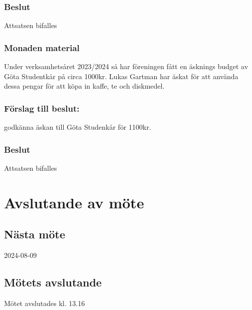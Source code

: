 \documentclass[protokoll]{dvd}
\begin{document}
\subsubsection*{Beslut}
\begin{attsatser}
    \item Attsatsen bifalles
\end{attsatser}

\subsubsection*{Monaden material}
Under verksamhetsåret 2023/2024 så har föreningen fått en äsknings budget av Göta Studentkår
på circa 1000kr. Lukas Gartman har äskat för att använda dessa pengar för att köpa
in kaffe, te och diskmedel.
\subsubsection*{Förslag till beslut:}
\begin{attsatser}
    \item godkänna äskan till Göta Studenkår för 1100kr.
\end{attsatser}

\subsubsection*{Beslut}
\begin{attsatser}
    \item Attsatsen bifalles
\end{attsatser}

\newpage
\section{Avslutande av möte}

\subsection{Nästa möte}
2024-08-09

\subsection{Mötets avslutande}
Mötet avslutades kl. 13.16

\styrelsesignaturer
\end{document}
